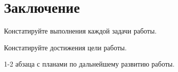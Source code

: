 \section*{Заключение}

Констатируйте выполнения каждой задачи работы.

Констатируйте достижения цели работы.

1-2 абзаца с планами по дальнейшему развитию работы.
